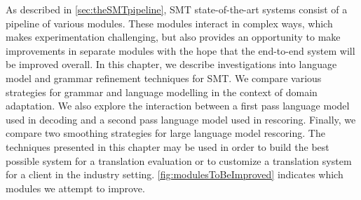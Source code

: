 As described in \autoref{sec:theSMTpipeline}, SMT state-of-the-art
systems consist of a pipeline of various modules. These modules
interact in complex ways, which makes experimentation challenging, but
also provides an opportunity to make improvements in separate modules with
the hope that the end-to-end system will be improved overall.
In this chapter, we describe investigations into language model
and grammar refinement techniques for SMT. We compare various strategies for grammar
and language modelling in the context of domain adaptation. We also explore
the interaction between a first pass language model used in decoding and a second
pass language model used in rescoring. Finally, we compare two smoothing
strategies for large language model rescoring.
The techniques presented in this chapter may be used in order
to build the best possible system for a
translation evaluation or to customize a translation system
for a client in the industry setting.
\autoref{fig:modulesToBeImproved} indicates which modules we attempt
to improve.
%
